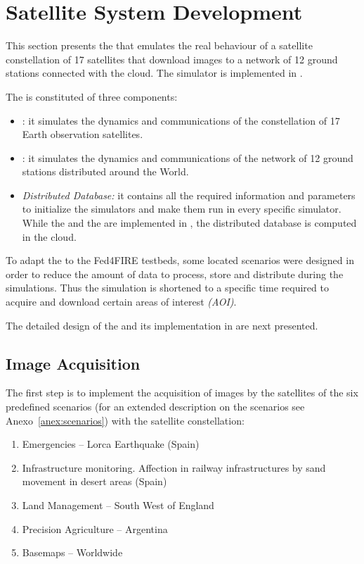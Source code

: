 \section{Satellite System Development}
\label{sec:spaceSystemSimulator}

This section presents the \sss that emulates the real behaviour of a satellite constellation of 17 satellites that download images to a network of 12 ground stations connected with the \bonfire cloud. The simulator is implemented in \vw.

The \sss is constituted of three components:
\begin{itemize}
\item \satss: it simulates the dynamics and communications of the constellation of 17 Earth observation satellites.
\item \gsss: it simulates the dynamics and communications of the network of 12 ground stations distributed around the World.
\item \emph{Distributed Database:} it contains all the required information and parameters to initialize the simulators and make them run in every specific simulator.
While the \satss and the \gsss are implemented in \vw, the distributed database
is computed in the \bonfire cloud.
\end{itemize}

To adapt the \sss to the Fed4FIRE testbeds, some located scenarios were designed in order to reduce the amount of data to process, store and distribute during the simulations. Thus the simulation is shortened to a specific time required to acquire and download certain areas of interest \emph{(AOI)}.

The detailed design of the \sss and its implementation in \vw are next presented.

\subsection{Image Acquisition}
\label{sec:image-acquisition}

The first step is to implement the acquisition of images by the satellites of
the six predefined scenarios (for an extended description on the scenarios see
Anexo~\ref{anex:scenarios}) with the satellite
constellation:

\begin{enumerate}
\item Emergencies – Lorca Earthquake (Spain)
\item  Infrastructure monitoring. Affection in railway infrastructures by sand movement in desert areas (Spain)
\item Land Management – South West of England
\item Precision Agriculture – Argentina
\item Basemaps – Worldwide
\end{enumerate}


